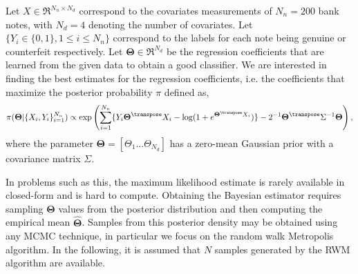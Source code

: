 Let $X \in \Re^{N_n \times N_d}$ correspond to the covariates measurements of $N_n = 200$ bank notes, with $N_d =4$ denoting the %
number of covariates. Let $\{Y_i  \in \{0,1\}, 1 \leq i \leq N_n \}$ correspond to the labels for each note being genuine or counterfeit respectively. Let $\boldsymbol{\Theta} \in \Re^{N_d}$ be the regression coefficients that are learned from the given data to obtain a good classifier. We are interested in finding the best estimates for the regression coefficients, i.e. the coefficients that maximize the posterior probability $\pi$ defined as,
\[
\pi(\boldsymbol{\Theta}| \{X_i,Y_i\}_{i=1}^{N_n}) \propto \exp\left( \sum_{i=1}^{N_n} \{Y_i \boldsymbol{\Theta}^\transpose X_i - \log(1+e^{\boldsymbol{\Theta}^\transpose X_i} ) \} - 2^{-1} \boldsymbol{\Theta}^\transpose \Sigma^{-1} \boldsymbol{\Theta} \right),
\]
where the parameter $\boldsymbol{\Theta} = [ \Theta_1 \dots \Theta_{N_d}]$ has a zero-mean Gaussian prior with a covariance matrix $\Sigma$.

In problems such as this, the maximum likelihood estimate is rarely available in closed-form and is hard to compute. Obtaining the Bayesian estimator requires sampling $\boldsymbol{\Theta}$ values from the posterior distribution and then computing the empirical mean $\hat{\boldsymbol{\Theta}}$. Samples from this posterior density may be obtained using any MCMC technique, in particular we focus on the random walk Metropolis algorithm. In the following, it is assumed that $N$ samples generated by the RWM algorithm are available.

